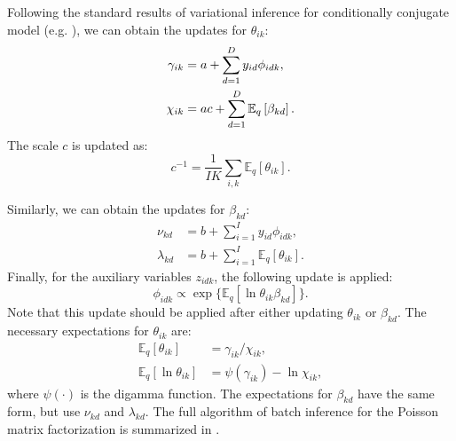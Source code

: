 Following the standard results of variational inference for conditionally conjugate model (e.g. \cite{hoffman2013stochastic}), we can obtain the updates for $\theta_{ik}$:
\begin{equation}\label{chpt:background:eq:theta}
\begin{split}
\gamma_{ik} &= a + \sum_{d=1}^D y_{id} \phi_{idk},\\
\chi_{ik} &= ac + \sum_{d=1}^D \mathbb{E}_{q}\left[\beta_{kd}\right].
\end{split}
\end{equation}
The scale $c$ is updated as:
\[
c^{-1} = \frac{1}{IK}\sum_{i, k} \mathbb{E}_q [\theta_{ik}].
\]

Similarly, we can obtain the updates for $\beta_{kd}$:
\begin{equation}\label{chpt:background:eq:beta}
\begin{split}
\nu_{kd} &= b + \sum_{i=1}^I y_{id} \phi_{idk},\\
\lambda_{kd} &= b + \sum_{i=1}^I \mathbb{E}_q[\theta_{ik}].
\end{split}
\end{equation}
Finally, for the auxiliary variables $z_{idk}$, the following update is applied:
\begin{equation*}
\phi_{idk} \propto \exp\{\mathbb{E}_q [\ln \theta_{ik} \beta_{kd}]\}.
\end{equation*}
Note that this update should be applied after either updating $\theta_{ik}$ or $\beta_{kd}$.
The necessary expectations for $\theta_{ik}$ are:
\begin{equation*}
\begin{split}
\mathbb{E}_q[\theta_{ik}] &= \gamma_{ik} / \chi_{ik}, \\
\mathbb{E}_q[\ln \theta_{ik}] &= \psi(\gamma_{ik}) - \ln \chi_{ik},
\end{split}
\end{equation*}
where $\psi(\cdot)$ is the digamma function. The expectations for $\beta_{kd}$ have the same form, but use $\nu_{kd}$ and $\lambda_{kd}$. The full algorithm of batch inference for the Poisson matrix factorization is summarized in .

